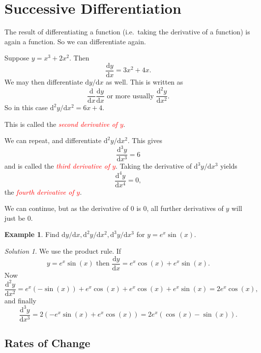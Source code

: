 \documentclass[
  11pt,
  oneside]{book}
\newcommand{\slide}{}
\theoremstyle{definition}
\theoremstyle{definition}
\newtheorem{example}{Example}[chapter]
\theoremstyle{definition}
\theoremstyle{definition}
\theoremstyle{remark}
\newtheorem*{solution}{Solution}
\begin{document}
\section{Successive Differentiation}\label{lecture-seven}

The result of differentiating a function (i.e.~taking the derivative of a function) is again a function. So we can differentiate again.

Suppose \(y = x^3 + 2x^2\). Then
\[
\frac{\mathrm{d} y}{\mathrm{d} x} = 3x^2 + 4x.
\]
We may then differentiate \(\mathrm{d}y/\mathrm{d} x\) as well. This is written as
\[
\frac{\mathrm{d}}{\mathrm{d} x}\frac{\mathrm{d} y}{\mathrm{d} x}\text{ or more usually }\frac{\mathrm{d}^{2}y}{\mathrm{d} x^2}.
\]
So in this case \(\mathrm{d}^{2}y/\mathrm{d} x^2 = 6x+4\).

This is called the \textcolor{red}{\em second derivative of $y$}.
\slide

We can repeat, and differentiate \(\mathrm{d}^{2}y/\mathrm{d} x^2\). This gives
\[
\frac{\mathrm{d}^{3}y}{\mathrm{d} x^{3}} = 6
\]
and is called the \textcolor{red}{\em third derivative of $y$}. Taking the derivative of \(\mathrm{d}^{3}y/\mathrm{d} x^{3}\) yields
\[
\frac{\mathrm{d}^{4}y}{\mathrm{d} x^{4}} = 0,
\]
the \textcolor{red}{\em fourth derivative of $y$}.

We can continue, but as the derivative of \(0\) is \(0\), all further derivatives of \(y\) will just be \(0\).
\slide

\begin{example}
Find \(\mathrm{d}y/\mathrm{d} x, \mathrm{d}^{2}y/\mathrm{d} x^2, \mathrm{d}^{3}y/\mathrm{d} x^{3}\) for \(y =e^x\sin(x)\).
\end{example}

\begin{solution}
We use the product rule. If
\[
y=e^x\sin(x)\text{ then }\frac{\mathrm{d} y}{\mathrm{d} x} = e^x\cos(x) + e^x\sin(x).
\]
Now
\[
\frac{\mathrm{d}^{2}y}{\mathrm{d} x^2} = e^x(-\sin(x)) + e^x\cos(x) + e^x\cos(x)+e^x\sin(x) = 2e^x\cos(x),
\]
and finally
\[
\frac{\mathrm{d}^{3}y}{\mathrm{d} x^{3}} = 2(-e^x\sin(x)+e^x\cos(x)) = 2e^x(\cos(x)-\sin(x)).
\]
\end{solution}

\slide

\subsection{Rates of Change}\label{rates-of-change}
\end{document}
